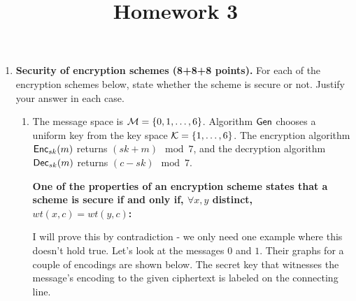 \documentclass[11pt]{article}
\begin{document}
\title{Homework 3}

\date{}

\maketitle 

\thispagestyle{fancy}  
\pagestyle{fancy}      




\begin{enumerate}
\item {\bfseries Security of encryption schemes (8+8+8 points).} For each of the encryption schemes below, state whether the scheme is secure or not. Justify your answer in each case. 
\begin{enumerate}
    \item The message space is ${\mathcal M} = \{0,1, \dotsc, 6 \}$. Algorithm $\mathsf{Gen}$ chooses a uniform key from the key space ${\mathcal K} = \{1, \dotsc, 6\}$. The encryption algorithm $\mathsf{Enc}_{sk}(m)$ returns $(sk+m) \mod 7$, and the decryption algorithm $\mathsf{Dec}_{sk}(m)$ returns $(c-sk) \mod 7$.\newline
    {\bfseries
    One of the properties of an encryption scheme states that a scheme is secure if and only if, $\forall x, y$ distinct, $wt(x,c) = wt(y,c)$: \newline
     \newline

    I will prove this by contradiction - we only need one example where this doesn't hold true. Let's look at the messages $0$ and $1$. Their graphs for a couple of encodings are shown below. The secret key that witnesses the message's encoding to the given ciphertext is labeled on the connecting line.

    }
\end{enumerate}
\end{enumerate}
\end{document}

